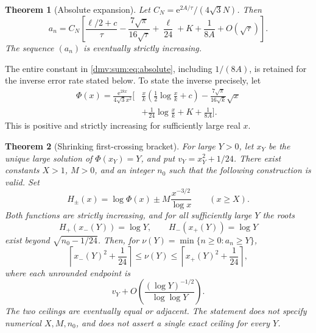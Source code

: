 \documentclass[11pt,letterpaper]{article}
\numberwithin{equation}{section}
\newtheorem{theorem}{Theorem}[section]
\theoremstyle{definition}\newtheorem{definition}[theorem]{Definition}
\theoremstyle{remark}\newtheorem{remark}[theorem]{Remark}
\newcommand{\ee}{\mathrm e}
\begin{document}
\begin{theorem}[Absolute expansion]\label{dmv:sum:thm:absolute}
Let $C_N=\ee^{2A/\tau}/(4\sqrt3 N)$. Then
\begin{equation}\label{dmv:sum:eq:absolute}
 a_n=C_N\left[\frac{\ell/2+c}{\tau}-\frac{7\sqrt\pi}{16\sqrt\tau}
                 +\frac\ell{24}+K+\frac1{8A}+O(\sqrt\tau)\right].
\end{equation}
The sequence $(a_n)$ is eventually strictly increasing.
\end{theorem}

The entire constant in \eqref{dmv:sum:eq:absolute}, including $1/(8A)$, is retained for the inverse error rate stated below. To state the inverse precisely, let
\begin{equation}\label{dmv:sum:eq:phi}
\begin{split}
\Phi(x)=\frac{\ee^{2kx}}{4\sqrt3 x^2}\bigg[
 &\frac{x}{k}\left(\frac12\log\frac{x}{k}+c\right)
 -\frac{7\sqrt\pi}{16\sqrt k}\sqrt x\\
 &+\frac1{24}\log\frac{x}{k}+K+\frac1{8A}\bigg].
\end{split}
\end{equation}
This is positive and strictly increasing for sufficiently large real $x$.

\begin{theorem}[Shrinking first-crossing bracket]\label{dmv:sum:thm:inverse}
For large $Y>0$, let $x_Y$ be the unique large solution of $\Phi(x_Y)=Y$, and put $v_Y=x_Y^2+1/24$. There exist constants $X>1$, $M>0$, and an integer $n_0$ such that the following construction is valid. Set
\begin{equation}\label{dmv:sum:eq:H}
 H_\pm(x)=\log\Phi(x)\pm M\frac{x^{-3/2}}{\log x}\qquad(x\ge X).
\end{equation}
Both functions are strictly increasing, and for all sufficiently large $Y$ the roots
\begin{equation}\label{dmv:sum:eq:roots}
 H_+(x_-(Y))=\log Y,\qquad H_-(x_+(Y))=\log Y
\end{equation}
exist beyond $\sqrt{n_0-1/24}$. Then, for $\nu(Y)=\min\{n\ge0:a_n\ge Y\}$,
\begin{equation}\label{dmv:sum:eq:ceiling}
 \left\lceil x_-(Y)^2+\frac1{24}\right\rceil\le\nu(Y)
 \le\left\lceil x_+(Y)^2+\frac1{24}\right\rceil,
\end{equation}
where each unrounded endpoint is
\begin{equation}\label{dmv:sum:eq:width}
 v_Y+O\!\left(\frac{(\log Y)^{-1/2}}{\log\log Y}\right).
\end{equation}
The two ceilings are eventually equal or adjacent. The statement does not specify numerical $X,M,n_0$, and does not assert a single exact ceiling for every $Y$.
\end{theorem}
\end{document}
